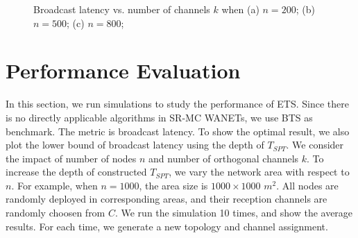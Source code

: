 \documentclass[10pt, conference]{IEEEtran}
\begin{document}
\begin{figure*}
\centering
{}
\caption{Broadcast latency vs. number of channels $k$ when (a) $n=200$; (b) $n=500$; (c) $n=800$;}
\label{fig2} \end{figure*}


\iffalse
\begin{figure*}
\centering
\texttt{[image: 1.pdf]}\hspace{1in}\texttt{[image: 2.pdf]}
\caption{Two Graphics in One Figure}
\end{figure*}

\begin{figure*}
\centering
\texttt{[image: 3.pdf]}\hspace{1in}\texttt{[image: 4.pdf]}
\caption{Two Graphics in One Figure}
\end{figure*}

\begin{figure*}[!ht]
\begin{minipage}[]{0.33\textwidth}
\centering\texttt{[image: 1.pdf]}
\caption{\textrm{Impact of $n$ when $k=10$}}\label{n}
\end{minipage}
\begin{minipage}[]{0.33\textwidth}
\centering\texttt{[image: 2.pdf]}
\caption{\textrm{Impact of $k$ when $n=500$}}\label{k}
\end{minipage}
\begin{minipage}[]{0.33\textwidth}
\centering\texttt{[image: 3.pdf]} \caption{\textrm{Variance of Running Times}}\label{var}
\end{minipage}
\end{figure*}
\fi

\section{Performance Evaluation} \label{eval}
In this section, we run simulations to study the performance of
ETS. Since there is no directly applicable algorithms in SR-MC
WANETs, we use BTS as benchmark. The metric is broadcast
latency. To show the optimal result, we also plot the lower
bound of broadcast latency using the depth of $T_{SPT}$. We
consider the impact of number of nodes $n$ and number of
orthogonal channels $k$. To increase the depth of constructed
$T_{SPT}$, we vary the network area with respect to $n$. For
example, when $n=1000$, the area size is $1000 \times 1000$
$m^2$. All nodes are randomly deployed in corresponding areas,
and their reception channels are randomly choosen from $C$. We
run the simulation 10 times, and show the average results. For
each time, we generate a new topology and channel assignment.
\end{document}
